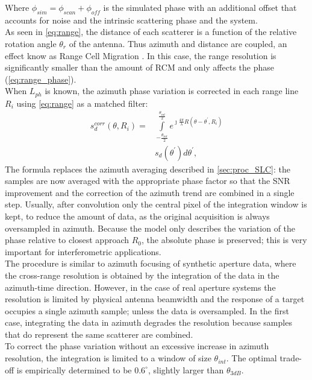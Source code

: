 Where $\phi_{sim} = \phi_{scan} + \phi_{off}$ is the simulated phase with an additional offset that accounts for noise and the intrinsic scattering phase and the system.\\
As seen in \autoref{eq:range}, the distance of each scatterer is a function of the relative rotation angle $\theta_r$ of the antenna. Thus azimuth and distance are coupled, an effect know as Range Cell Migration . In this case, the range resolution is significantly smaller than the amount of RCM and only affects the phase (\autoref{eq:range_phase}).\\
When $L_{ph}$ is known, the azimuth phase variation is corrected in each range line $R_{i}$ using \autoref{eq:range} as a matched filter:
\begin{equation}\label{eq:correction}
	\begin{aligned}
		s_{d}^{corr}\left(\theta, R_{i}\right) = &\int\limits_{-\frac{\theta_{int}}{2}}^{\frac{\theta_{int}}{2}}e^{\jmath \frac{4\pi}{\lambda}R\left(\theta - \theta^{\prime}, R_{i}\right)}\\
		&s_{d}\left(\theta^\prime\right) d\theta^\prime,
	\end{aligned}
\end{equation}
The formula replaces the azimuth averaging described in \autoref{sec:proc_SLC}: the samples are now averaged with the appropriate phase factor so that the SNR improvement and the correction of the azimuth trend are combined in a single step. Usually, after convolution only the central pixel of the integration window is kept, to reduce the amount of data, as the original acquisition is always oversampled in azimuth. Because the model only describes the variation of the phase relative to closest approach $R_{0}$, the absolute phase is preserved; this is very important for interferometric applications.\\
The procedure is similar to azimuth focusing of synthetic aperture data, where the cross-range resolution is obtained by the integration of the data in the azimuth-time direction. However, in the case of real aperture systems the resolution is limited by physical antenna beamwidth and the response of a target  occupies a single azimuth sample; unless the data is oversampled. In the first case, integrating the data in azimuth degrades the resolution because samples that do represent the same scatterer are combined.\\ To correct the phase variation without an excessive increase in azimuth resolution, the integration is limited to a window of size $\theta_{int}$. The optimal trade-off is empirically determined to be $0.6^\circ$, slightly larger than $\theta_{3dB}$.
